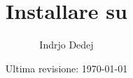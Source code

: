 


\title{Installare \texlive{} su \gnulinux{}}
\author{Indrjo Dedej}
\date{Ultima revisione: \today}


\maketitle
\tableofcontents






\printbibliography

